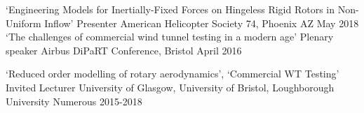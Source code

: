 \begin{cventries}
      \cventry
    {`Engineering Models for Inertially-Fixed Forces on Hingeless Rigid Rotors in Non-Uniform Inflow'} %
    {Presenter} %
    {\hspace{-2cm}American Helicopter Society 74, Phoenix AZ} %
    {May 2018}{} %
    \cventry
    {`The challenges of commercial wind tunnel testing in a modern age'} %
    {Plenary speaker} %
    {\hspace{-2cm}Airbus DiPaRT Conference, Bristol} %
    {April 2016}{} %
    
    \cventry
    {`Reduced order modelling of rotary aerodynamics', `Commercial WT Testing'} %
    {Invited Lecturer} %
    {\hspace{-6cm}University of Glasgow, University of Bristol, Loughborough University } %
    {Numerous 2015-2018}{} %
   
   
\end{cventries}

